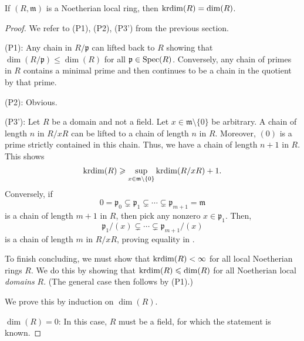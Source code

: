 \documentclass[12pt]{article}
\begin{document}
\begin{thm}
	If $(R, \mathfrak{m})$ is a Noetherian local ring, then $\operatorname{krdim}(R) = \dim(R)$.
\end{thm}
\begin{proof} 
	We refer to (P1), (P2), (P3') from the previous section.

	(P1): Any chain in $R/\mathfrak{p}$ can lifted back to $R$ showing that $\dim(R/\mathfrak{p}) \le \dim(R)$ for all $\mathfrak{p} \in \operatorname{Spec}(R)$. \newline
	Conversely, any chain of primes in $R$ contains a minimal prime and then continues to be a chain in the quotient by that prime.

	(P2): Obvious.

	(P3'): Let $R$ be a domain and not a field. \newline
	Let $x \in \mathfrak{m} \setminus \{0\}$ be arbitrary. A chain of length $n$ in $R/xR$ can be lifted to a chain of length $n$ in $R$. Moreover, $(0)$ is a prime strictly contained in this chain. Thus, we have a chain of length $n + 1$ in $R$. This shows
	\begin{equation} \label{eq:007}
		\operatorname{krdim}(R) \geqslant \sup_{x \in \mathfrak{m} \setminus \{0\}} \operatorname{krdim}(R/xR) + 1.
	\end{equation}
	Conversely, if 
	\begin{equation*} 
		0 = \mathfrak{p}_{0} \subsetneq \mathfrak{p}_{1} \subsetneq \cdots \subsetneq \mathfrak{p}_{m + 1} = \mathfrak{m}
	\end{equation*}
	is a chain of length $m + 1$ in $R$, then pick any nonzero $x \in \mathfrak{p}_{1}$. Then,
	\begin{equation*} 
		\mathfrak{p}_{1}/(x) \subsetneq \cdots \subsetneq \mathfrak{p}_{m + 1}/(x)
	\end{equation*}
	is a chain of length $m$ in $R/xR$, proving equality in .

	To finish concluding, we must show that $\operatorname{krdim}(R) < \infty$ for all local Noetherian rings $R$. We do this by showing that $\operatorname{krdim}(R) \leqslant \dim(R)$ for all Noetherian local \emph{domains} $R$. (The general case then follows by (P1).)

	We prove this by induction on $\dim(R)$. 

	$\dim(R) = 0$: In this case, $R$ must be a field, for which the statement is known.


\end{proof}
\end{document}
